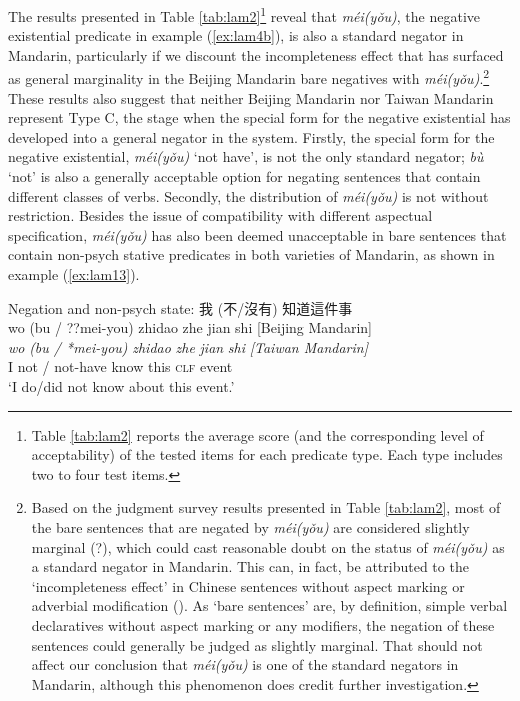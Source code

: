 \documentclass[output=paper]{langscibook}
\begin{document}
The results presented in Table \ref{tab:lam2}\footnote{Table \ref{tab:lam2} reports the average score (and the corresponding level of acceptability) of the tested items for each predicate type. Each type includes two to four test items.} reveal that \textit{méi(yǒu)}, the negative existential predicate in example (\ref{ex:lam4b}), is also a standard negator in Mandarin, particularly if we discount the incompleteness effect that has surfaced as general marginality in the Beijing Mandarin bare negatives with \textit{méi(yǒu)}.\footnote{Based on the judgment survey results presented in Table \ref{tab:lam2}, most of the bare sentences that are negated by \textit{méi(yǒu)} are considered slightly marginal (?), which could cast reasonable doubt on the status of \textit{méi(yǒu)} as a standard negator in Mandarin. This can, in fact, be attributed to the `incompleteness effect' in Chinese sentences without aspect marking or adverbial modification (\citealt{Tsai2008}).
As `bare sentences' are, by definition, simple verbal declaratives without aspect marking or any modifiers, the negation of these sentences could generally be judged as slightly marginal. That should not affect our conclusion that \textit{méi(yǒu)} is one of the standard negators in Mandarin, although this phenomenon does credit further investigation.} 
These results also suggest that neither Beijing Mandarin nor Taiwan Mandarin represent Type C, the stage when the special form for the negative existential has developed into a general negator in the system. Firstly, the special form for the negative existential, \textit{méi(yǒu)} `not have', is not the only standard negator; \textit{bù} `not' is also a generally acceptable option for negating sentences that contain different classes of verbs. Secondly, the distribution of \textit{méi(yǒu)} is not without restriction. Besides the issue of compatibility with different aspectual specification, \textit{méi(yǒu)} has also been deemed unacceptable in bare sentences that contain non-psych stative predicates in both varieties of Mandarin, as shown in example (\ref{ex:lam13}). 

\ea Negation and non-psych state: 我 (不/沒有) 知道這件事 \label{ex:lam13}\\
  \glll wo {(bu / ??mei-you)} zhidao zhe jian shi {[Beijing Mandarin]}\\
  \textit{wo} \textit{(bu / *mei-you)} \textit{zhidao} \textit{zhe} \textit{jian} \textit{shi} \textit{[Taiwan Mandarin]}\\
  I {not / not-have} know this \textsc{clf} event\\
  \glt `I do/did not know about this event.' 
\z 
\end{document}

